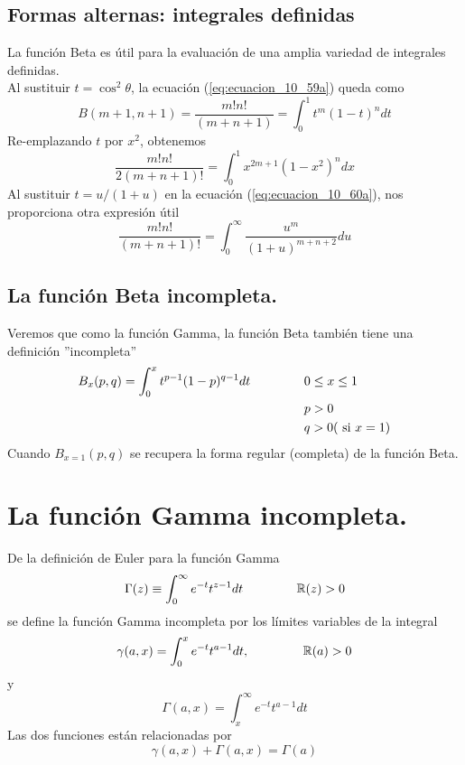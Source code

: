 \subsection{Formas alternas: integrales definidas}
La función Beta es útil para la evaluación de una amplia variedad de integrales definidas.\\
Al sustituir $t= \cos^{2} \theta$, la ecuación (\ref{eq:ecuacion_10_59a}) queda como
\begin{equation}
B(m+1,n+1) = \dfrac{m! n!}{(m+n+1)} = \int_{0}^{1} t^{m} (1-t)^{n} dt
\label{eq:ecuacion_10_60a}
\end{equation}
Re-emplazando $t$ por $x^{2}$, obtenemos
\begin{equation}
\dfrac{m! n!}{2(m+n+1)!} = \int_{0}^{1} x^{2m+1} (1-x^{2})^{n} dx
\label{eq:ecuacion_10_60a}
\end{equation}
Al sustituir $t= u/(1+u)$ en la ecuación (\ref{eq:ecuacion_10_60a}), nos proporciona otra expresión útil
\begin{equation}
\dfrac{m! n!}{(m+n+1)!} = \int_{0}^{\infty} \dfrac{u^{m}}{(1+u)^{m+n+2}} du
\label{eq:ecuacion_10_61}
\end{equation}
\subsection{La función Beta incompleta.}
Veremos que como la función Gamma, la función Beta también tiene una definición ''incompleta''
\begin{eqnarray}
\begin{aligned}
B_{x}(p,q) = \int_{0}^{x} t^{p-1} (1-p)^{q-1} dt \hspace{1.5cm} & 0 \leq x \leq 1 \\
& p > 0 \\
& q > 0 (\text{ si } x=1)
\label{eq:ecuacion_10_67}
\end{aligned}
\end{eqnarray}
Cuando $B_{x=1}(p,q)$ se recupera la forma regular (completa) de la función Beta.
\section{La función Gamma incompleta.}
De la definición de Euler para la función Gamma 
\[  \Gamma(z) \equiv \int_{0}^{\infty} e^{-t} t^{z-1} dt \hspace{1.5cm} \mathbb{R}(z) > 0 \]
se define la función Gamma incompleta por los límites variables de la integral
\[ \gamma(a,x) = \int_{0}^{x} e^{-t} t^{a-1} dt, \hspace{1.5cm} \mathbb{R} (a) > 0 \]
y
\begin{equation}
\Gamma(a,x) = \int_{x}^{\infty} e^{-t} t^{a-1} dt 
\label{eq:ecuacion_10_68}
\end{equation}
Las dos funciones están relacionadas por
\begin{equation}
\gamma(a,x) + \Gamma(a,x) = \Gamma(a)
\end{equation}



